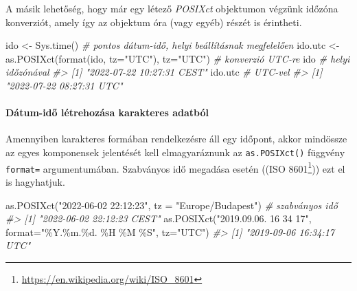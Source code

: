 \documentclass[
]{book}
\newenvironment{Shaded}{\begin{snugshade}}{\end{snugshade}}
\newcommand{\AttributeTok}[1]{\textcolor[rgb]{0.77,0.63,0.00}{#1}}
\newcommand{\CommentTok}[1]{\textcolor[rgb]{0.56,0.35,0.01}{\textit{#1}}}
\newcommand{\FunctionTok}[1]{\textcolor[rgb]{0.00,0.00,0.00}{#1}}
\newcommand{\NormalTok}[1]{#1}
\newcommand{\OtherTok}[1]{\textcolor[rgb]{0.56,0.35,0.01}{#1}}
\newcommand{\StringTok}[1]{\textcolor[rgb]{0.31,0.60,0.02}{#1}}
\DeclareRobustCommand{\href}[2]{#2\footnote{\url{#1}}}
\renewcommand{\href}[2]{#2\footnote{\url{#1}}}
\begin{document}
A másik lehetőség, hogy már egy létező \emph{POSIXct} objektumon végzünk időzóna konverziót, amely így az objektum óra (vagy egyéb) részét is érintheti.

\begin{Shaded}
\begin{Highlighting}[]
\NormalTok{ido }\OtherTok{\textless{}{-}} \FunctionTok{Sys.time}\NormalTok{()  }\CommentTok{\# pontos dátum{-}idő, helyi beállításnak megfelelően}
\NormalTok{ido.utc }\OtherTok{\textless{}{-}} \FunctionTok{as.POSIXct}\NormalTok{(}\FunctionTok{format}\NormalTok{(ido, }\AttributeTok{tz=}\StringTok{"UTC"}\NormalTok{), }\AttributeTok{tz=}\StringTok{"UTC"}\NormalTok{)  }\CommentTok{\# konverzió UTC{-}re}
\NormalTok{ido        }\CommentTok{\# helyi időzónával}
\CommentTok{\#\textgreater{} [1] "2022{-}07{-}22 10:27:31 CEST"}
\NormalTok{ido.utc    }\CommentTok{\# UTC{-}vel}
\CommentTok{\#\textgreater{} [1] "2022{-}07{-}22 08:27:31 UTC"}
\end{Highlighting}
\end{Shaded}

\hypertarget{duxe1tum-idux151-luxe9trehozuxe1sa-karakteres-adatbuxf3l}{%
\paragraph{Dátum-idő létrehozása karakteres adatból}\label{duxe1tum-idux151-luxe9trehozuxe1sa-karakteres-adatbuxf3l}}

Amennyiben karakteres formában rendelkezésre áll egy időpont, akkor mindössze az egyes komponensek jelentését kell elmagyaráznunk az \texttt{as.POSIXct()} függvény \texttt{format=} argumentumában. Szabványos idő megadása esetén ((\href{https://en.wikipedia.org/wiki/ISO_8601}{ISO 8601})) ezt el is hagyhatjuk.

\begin{Shaded}
\begin{Highlighting}[]
\FunctionTok{as.POSIXct}\NormalTok{(}\StringTok{"2022{-}06{-}02 22:12:23"}\NormalTok{, }\AttributeTok{tz =} \StringTok{"Europe/Budapest"}\NormalTok{)  }\CommentTok{\# szabványos idő}
\CommentTok{\#\textgreater{} [1] "2022{-}06{-}02 22:12:23 CEST"}
\FunctionTok{as.POSIXct}\NormalTok{(}\StringTok{"2019.09.06. 16 34 17"}\NormalTok{, }\AttributeTok{format=}\StringTok{"\%Y.\%m.\%d. \%H \%M \%S"}\NormalTok{, }\AttributeTok{tz=}\StringTok{"UTC"}\NormalTok{)}
\CommentTok{\#\textgreater{} [1] "2019{-}09{-}06 16:34:17 UTC"}
\end{Highlighting}
\end{Shaded}
\end{document}
